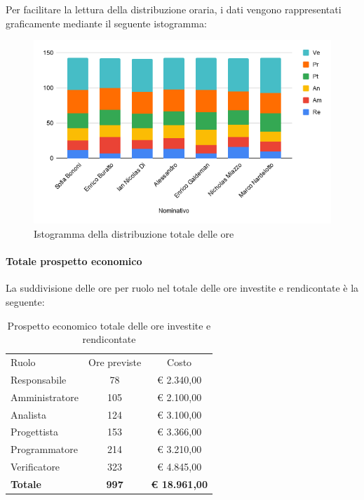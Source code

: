 \documentclass[../piano-di-progetto.tex]{subfiles}
\begin{document}
    Per facilitare la lettura della distribuzione oraria, i dati vengono rappresentati graficamente mediante il seguente istogramma:
    \begin{figure}[H]
      \centering
      \includegraphics[width=12cm]{img/ore-totale.png}
      \caption{Istogramma della distribuzione totale delle ore}
      \label{fig:ore-totali}
    \end{figure}

    \paragraph{Totale prospetto economico}
    La suddivisione delle ore per ruolo nel totale delle ore investite e rendicontate è la seguente:
    \begin{table}[H]
      \centering
      \begin{tabular}{lcc}
        Ruolo           & Ore previste & Costo                \\
        Responsabile    & 78           & € 2.340,00           \\
        Amministratore  & 105          & € 2.100,00           \\
        Analista        & 124          & € 3.100,00           \\
        Progettista     & 153          & € 3.366,00           \\
        Programmatore   & 214          & € 3.210,00           \\
        Verificatore    & 323          & € 4.845,00           \\
        \textbf{Totale} & \textbf{997} & \textbf{€ 18.961,00}
      \end{tabular}
      \caption{Prospetto economico totale delle ore investite e rendicontate}
    \end{table}
\end{document}
